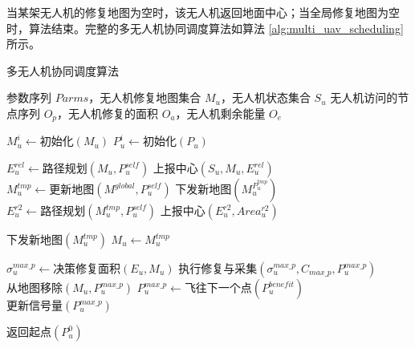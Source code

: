 \documentclass[AutoFakeBold]{LZUThesis}
\begin{document}
当某架无人机的修复地图为空时，该无人机返回地面中心；当全局修复地图为空时，算法结束。完整的多无人机协同调度算法如算法 \ref{alg:multi_uav_scheduling} 所示。

\begin{algorithm}[H]
	\caption{多无人机协同调度算法}
	\label{alg:multi_uav_scheduling}
	\begin{algorithmic}[1]
		\Require 参数序列 $Parms$，无人机修复地图集合 $M_u$，无人机状态集合 $S_u$
		\Ensure 无人机访问的节点序列 $O_p$，无人机修复的面积 $O_a$，无人机剩余能量 $O_e$

		\State $M_u^i \gets \text{初始化}(M_u)$ 
		\State $P_u^i \gets \text{初始化}(P_u)$ 

		\State $E_u^{rel} \gets \text{路径规划}(M_u, P_u^{self})$ 
		\State $\text{上报中心}(S_u, M_u, E_u^{rel})$ 
		\State $M_u^{tmp} \gets \text{更新地图}(M^{global}, P_u^{self})$ 
		\State $\text{下发新地图}(M_u^{P_u^{tmp}})$ 
		\State $E_u^{r2} \gets \text{路径规划}(M_u^{tmp}, P_u^{self})$ 
		\State $\text{上报中心}(E_u^{r2}, Area_u^{r2})$ 

		\State $\text{下发新地图}(M_u^{tmp})$ 
		\State $M_u \gets M_u^{tmp}$
		\EndIf

		\State $\sigma_u^{max\_p} \gets \text{决策修复面积}(E_u, M_u)$ 
		\State $\text{执行修复与采集}(\sigma_u^{max\_p}, C_{max\_p}, P_u^{max\_p})$ 
		\State $\text{从地图移除}(M_u, P_u^{max\_p})$
		\State $P_u^{max\_p} \gets \text{飞往下一个点}(P_u^{benefit})$ 
		\State $\text{更新信号量}(P_u^{max\_p})$ 
		\EndWhile

		\State $\text{返回起点}(P_u^0)$ 
	\end{algorithmic}
\end{algorithm}
\end{document}
